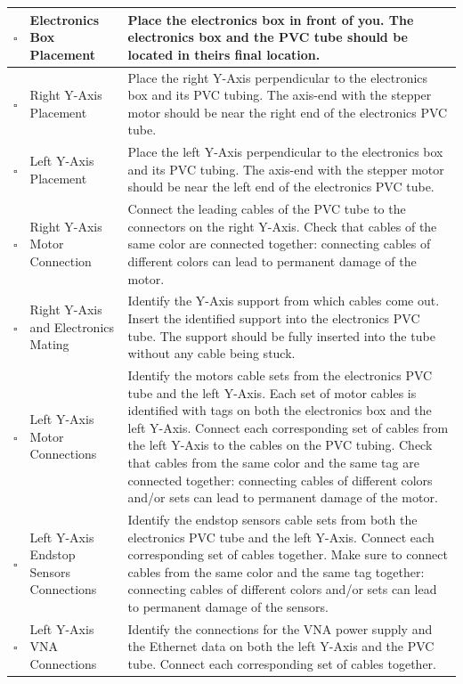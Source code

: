 \documentclass{article}
\begin{document}
\begin{onehalfspacing}
\begin{xltabular}{\textwidth}{|c|p{4cm}|X|}
    $\square$ & Electronics Box Placement & Place the electronics box in front of you. The electronics box and the PVC tube should be located in theirs final location. \\ \hline
    $\square$ & Right Y-Axis Placement & Place the right Y-Axis perpendicular to the electronics box and its PVC tubing. The axis-end with the stepper motor should be near the right end of the electronics PVC tube. \\ \hline
    $\square$ & Left Y-Axis Placement & Place the left Y-Axis perpendicular to the electronics box and its PVC tubing. The axis-end with the stepper motor should be near the left end of the electronics PVC tube. \\ \hline
    $\square$ & Right Y-Axis Motor Connection & Connect the leading cables of the PVC tube to the connectors on the right Y-Axis. Check that cables of the same color are connected together: connecting cables of different colors can lead to permanent damage of the motor. \\ \hline
    $\square$ & Right Y-Axis and Electronics Mating & Identify the Y-Axis support from which cables come out. Insert the identified support into the electronics PVC tube. The support should be fully inserted into the tube without any cable being stuck. \\ \hline
    $\square$ & Left Y-Axis Motor Connections & Identify the motors cable sets from the electronics PVC tube and the left Y-Axis. Each set of motor cables is identified with tags on both the electronics box and the left Y-Axis. Connect each corresponding set of cables from the left Y-Axis to the cables on the PVC tubing. Check that cables from the same color and the same tag are connected together: connecting cables of different colors and/or sets can lead to permanent damage of the motor. \\ \hline
    $\square$ & Left Y-Axis Endstop Sensors Connections & Identify the endstop sensors cable sets from both the electronics PVC tube and the left Y-Axis. Connect each corresponding set of cables together. Make sure to connect cables from the same color and the same tag together: connecting cables of different colors and/or sets can lead to permanent damage of the sensors. \\ \hline
    $\square$ & Left Y-Axis VNA Connections & Identify the connections for the VNA power supply and the Ethernet data on both the left Y-Axis and the PVC tube.  Connect each corresponding set of cables together. \\ \hline

\end{xltabular}
\end{onehalfspacing}
\end{document}
